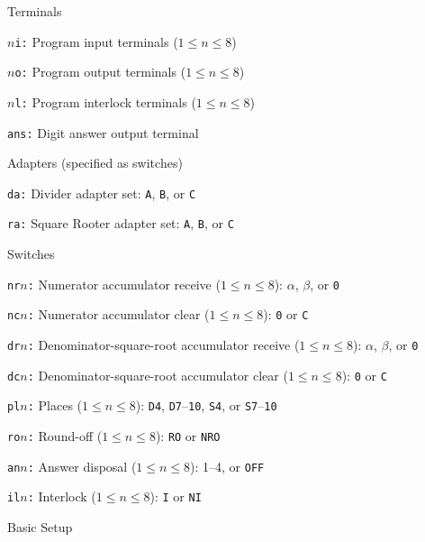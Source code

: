 Terminals

{\advance\leftskip 0.5in
\item{\tt $n$i:} Program input terminals ($1\le n\le 8$)
\item{\tt $n$o:} Program output terminals ($1\le n\le 8$)
\item{\tt $n$l:} Program interlock terminals ($1\le n\le 8$)
\item{\tt ans:} Digit answer output terminal

}

Adapters (specified as switches)

{\advance\leftskip 0.5in
\item{\tt da:} Divider adapter set: {\tt A}, {\tt B}, or {\tt C}
\item{\tt ra:} Square Rooter adapter set: {\tt A}, {\tt B}, or {\tt C}

}

Switches

{\advance\leftskip 0.5in
\item{\tt nr$n$:} Numerator accumulator receive ($1\le n\le 8$): $\alpha$, $\beta$, or {\tt 0}
\item{\tt nc$n$:} Numerator accumulator clear ($1\le n\le 8$): {\tt 0} or {\tt C}
\item{\tt dr$n$:} Denominator-square-root accumulator receive ($1\le n\le 8$): $\alpha$, $\beta$, or {\tt 0}
\item{\tt dc$n$:} Denominator-square-root accumulator clear ($1\le n\le 8$): {\tt 0} or {\tt C}
\item{\tt pl$n$:} Places ($1\le n\le 8$): {\tt D4}, {\tt D7}--{\tt 10}, {\tt S4}, or {\tt S7}--{\tt 10}
\item{\tt ro$n$:} Round-off ($1\le n\le 8$): {\tt RO} or {\tt NRO}
\item{\tt an$n$:} Answer disposal ($1\le n\le 8$): 1--4, or {\tt OFF}
\item{\tt il$n$:} Interlock ($1\le n\le 8$): {\tt I} or {\tt NI}

}

Basic Setup


